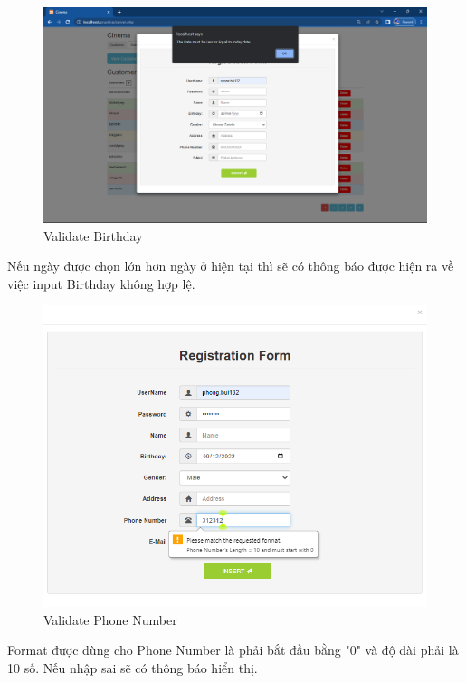 \begin{figure}[H]
    \centering
    \includegraphics[scale=0.45]{images/validateBirthday.png}
    \caption{Validate Birthday}
\end{figure}
Nếu ngày được chọn lớn hơn ngày ở hiện tại thì sẽ có thông báo được hiện ra về việc input Birthday không hợp lệ.

\begin{figure}[H]
    \centering
    \includegraphics[scale=0.45]{images/validatePhone.png}
    \caption{Validate Phone Number}
\end{figure}
Format được dùng cho Phone Number là phải bắt đầu bằng "0" và độ dài phải là 10 số. Nếu nhập sai sẽ có thông báo hiển thị.

